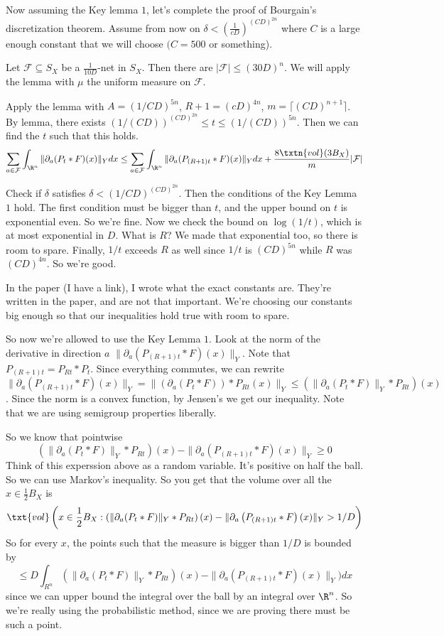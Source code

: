 Now assuming the Key lemma $1$, let's complete the proof of Bourgain's discretization theorem. Assume from now on $\delta < \left(\frac{1}{cD}\right)^{(CD)^{2n}}$ where $C$ is a large enough constant that we will choose $(C = 500$ or something). 

Let $\mathcal{F} \subseteq S_X$ be a $\frac{1}{10D}$-net in $S_X$. Then there are $|\mathcal{F}| \leq (30D)^n$. We will apply the lemma with $\mu$ the uniform measure on $\mathcal{F}$. 

Apply the lemma with $A = (1/CD)^{5n}$, $R + 1 = (cD)^{4n}$, $m = \lceil (CD)^{n + 1} \rceil$. By lemma, there exists $(1/(CD))^{(CD)^{2n}} \leq t \leq (1/(CD))^{5n}$. Then we can find the $t$ such that this holds. 
\[
\sum_{a \in \mathcal{F}} \int_{\R^n} \|\partial_a(P_t *F)(x)\|_Y dx \leq \sum_{a \in \mathcal{F}} \int_{\R^n} \|\partial_a(P_{(R + 1)t}*F)(x)\|_Y dx + \frac{8\txtn{vol}(3B_X)}{m} |\mathcal{F}|
\] 

Check if $\delta$ satisfies $\delta < (1/CD)^{(CD)^{2n}}$. Then the conditions of the Key Lemma $1$ hold. The first condition must be bigger than $t$, and the upper bound on $t$ is exponential even. So we're fine. Now we check the bound on $\log(1/t)$, which is at most exponential in $D$. What is $R$? We made that exponential too, so there is room to spare. Finally, $1/t$ exceeds $R$ as well since $1/t$ is $(CD)^{5n}$ while $R$ was $(CD)^{4n}$. So we're good. 

In the paper (I have a link), I wrote what the exact constants are. They're written in the paper, and are not that important. We're choosing our constants big enough so that our inequalities hold true with room to spare. 

So now we're allowed to use the Key Lemma $1$. Look at the norm of the derivative in direction $a$ $\|\partial_a(P_{(R + 1)t}*F)(x)\|_Y$. Note that $P_{(R + 1)t} = P_{Rt} * P_t$. Since everything commutes, we can rewrite $\|\partial_a(P_{(R + 1)t}*F)(x)\|_Y = \|\left(\partial_a(P_t*F)\right)*P_{Rt}(x)\|_Y \leq \left(\|\partial_a(P_t*F)\|_Y * P_{Rt}\right)(x)$. Since the norm is a convex function, by Jensen's we get our inequality. Note that we are using semigroup properties liberally. 

So we know that pointwise
\[
\left(\|\partial_a(P_t*F)\|_Y * P_{Rt}\right)(x) - \|\partial_a\left(P_{(R + 1)t}*F\right)(x)\|_Y \geq 0
\]
Think of this experssion above as a random variable. It's positive on half the ball. So we can use Markov's inequality. So you get that the volume over all the $x \in \frac{1}{2}B_X$ is 
\[
\txt{vol}\left(x \in \frac{1}{2}B_X : \left(\|\partial_a(P_t*F)\|_Y * P_{Rt}\right)(x) - \|\partial_a\left(P_{(R + 1)t}*F\right)(x)\|_Y  > 1/D\right)
\]
So for every $x$, the points such that the measure is bigger than $1/D$ is bounded by 
\[
\leq D\int_{R^n} \left(\|\partial_a(P_t*F)\|_Y * P_{Rt}\right)(x) - \|\partial_a\left(P_{(R + 1)t}*F\right)(x)\|_Y ) dx
\]
since we can upper bound the integral over the ball by an integral over $\R^n$. 
So we're really using the probabilistic method, since we are proving there must be such a point. 

